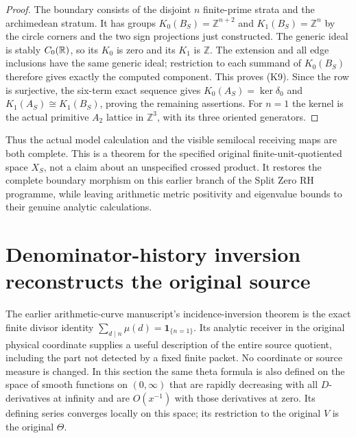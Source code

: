 \documentclass[11pt]{article}
\begin{document}
\begin{proof}
The boundary consists of the disjoint $n$ finite-prime strata and
the archimedean stratum. It has groups
$K_0(B_S)=\mathbb Z^{n+2}$ and $K_1(B_S)=\mathbb Z^n$ by the
circle corners and the two sign projections just constructed.
The generic ideal is stably $C_0(\mathbb R)$, so its $K_0$ is zero and
its $K_1$ is $\mathbb Z$. The extension and all edge inclusions have
the same generic ideal; restriction to each summand of $K_0(B_S)$
therefore gives exactly the computed component. This proves (K9).
Since the row is surjective, the six-term exact sequence gives
$K_0(A_S)=\ker\delta_0$ and $K_1(A_S)\cong K_1(B_S)$, proving the
remaining assertions. For $n=1$ the kernel is the actual primitive
$A_2$ lattice in $\mathbb Z^3$, with its three oriented generators.
\end{proof}

Thus the actual model calculation and the visible semilocal receiving
maps are both complete. This is a theorem for the specified original
finite-unit-quotiented space $X_S$, not a claim about an unspecified
crossed product. It restores the complete boundary morphism on this
earlier branch of the Split Zero RH programme, while leaving arithmetic
metric positivity and eigenvalue bounds to their genuine analytic
calculations.

\section{Denominator-history inversion reconstructs the original source}
The earlier arithmetic-curve manuscript's incidence-inversion theorem
is the exact finite divisor identity
$\sum_{d\mid n}\mu(d)=\mathbf1_{\{n=1\}}$. Its analytic receiver
in the original physical coordinate supplies a useful description of
the entire source quotient, including the part not detected by a fixed
finite packet. No coordinate or source measure is changed. In this
section the same theta formula is also defined on the space of smooth
functions on $(0,\infty)$ that are rapidly decreasing with all
$D$-derivatives at infinity and are $O(x^{-1})$ with those derivatives
at zero. Its defining series converges locally on this space; its
restriction to the original $V$ is the original $\Theta$.
\end{document}
